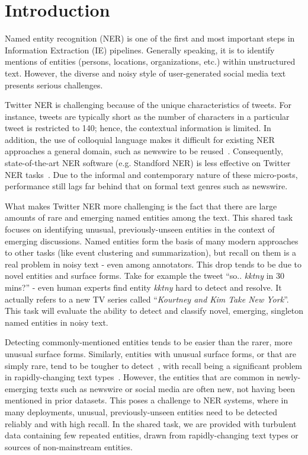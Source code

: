 \section{Introduction}
\label{sec:intro}
Named entity recognition (NER) is one of the first and most important steps in Information Extraction (IE) pipelines. Generally speaking, it is to identify mentions of entities (persons, locations, organizations, etc.)
within unstructured text. However, the diverse and noisy style of user-generated social media text presents serious challenges.
 
Twitter NER is challenging because of the
unique characteristics of tweets. For instance, tweets are typically short as the number of characters in a
particular tweet is restricted to 140; hence, the contextual information is limited. In addition, the use of
colloquial language makes it difficult for existing NER approaches a general domain, such as newswire
to be reused~\cite{baldwin2015shared}. Consequently, state-of-the-art NER software (e.g. Standford NER)
is less effective on Twitter NER tasks~\cite{derczynski2015analysis}.
Due to the informal and contemporary nature of these micro-posts, performance still lags far behind that on formal text genres such as newswire. 

What makes Twitter NER more challenging is the fact that there are large amounts of rare and emerging named entities among the text.
This shared task focuses on identifying unusual, previously-unseen entities in the context of emerging discussions. Named entities form the basis of many modern approaches to other tasks (like event clustering and summarization), but recall on them is a real problem in noisy text - even among annotators. This drop tends to be due to novel entities and surface forms. Take for example the tweet ``so.. \textit{kktny} in 30 mins?'' - even human experts find entity \textit{kktny} hard to detect and resolve. It actually refers to a new TV series called ``\textit{Kourtney and Kim Take New York}''. This task will evaluate the ability to detect and classify novel, emerging, singleton named entities in noisy text.

Detecting commonly-mentioned entities tends to be easier than the rarer, more unusual surface forms. Similarly, entities with unusual surface forms, or that are simply rare, tend to be tougher to detect~\cite{augenstein2017generalisation}, with recall being a significant problem in rapidly-changing text types~\cite{derczynski2015analysis}. However, the entities that are common in newly-emerging texts such as newswire or social media are often new, not having been mentioned in prior datasets. This poses a challenge to NER systems, where in many deployments, unusual, previously-unseen entities need to be detected reliably and with high recall. In the shared task, we are provided with turbulent data containing few repeated entities, drawn from rapidly-changing text types or sources of non-mainstream entities.

